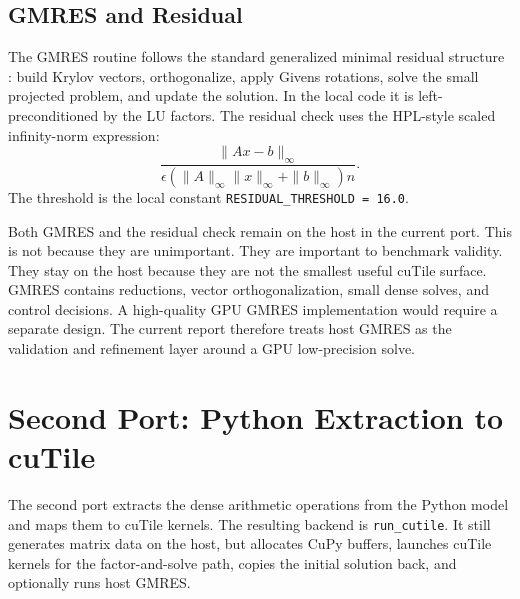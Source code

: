 \documentclass[11pt]{article}
\newcommand{\cutile}{cuTile}
\newcommand{\code}[1]{\texttt{#1}}
\begin{document}
\subsection{GMRES and Residual}

The GMRES routine follows the standard generalized minimal residual structure
\cite{saad-schultz-gmres}: build Krylov vectors, orthogonalize, apply Givens
rotations, solve the small projected problem, and update the solution. In the
local code it is left-preconditioned by the LU factors. The residual check uses
the HPL-style scaled infinity-norm expression:
\[
  \frac{\|Ax-b\|_\infty}
  {\epsilon(\|A\|_\infty\|x\|_\infty+\|b\|_\infty)n}.
\]
The threshold is the local constant \code{RESIDUAL\_THRESHOLD = 16.0}.

Both GMRES and the residual check remain on the host in the current port. This
is not because they are unimportant. They are important to benchmark validity.
They stay on the host because they are not the smallest useful \cutile{}
surface. GMRES contains reductions, vector orthogonalization, small dense
solves, and control decisions. A high-quality GPU GMRES implementation would
require a separate design. The current report therefore treats host GMRES as
the validation and refinement layer around a GPU low-precision solve.

\section{Second Port: Python Extraction to cuTile}

The second port extracts the dense arithmetic operations from the Python model
and maps them to \cutile{} kernels. The resulting backend is
\code{run\_cutile}. It still generates matrix data on the host, but allocates
CuPy buffers, launches \cutile{} kernels for the factor-and-solve path, copies
the initial solution back, and optionally runs host GMRES.
\end{document}
